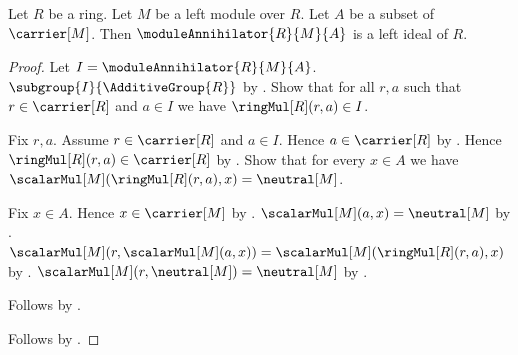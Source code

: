 \begin{theorem}\label{module_annihilator_is_left_ideal}
    Let $R$ be a ring.
    Let $M$ be a left module over $R$.
    Let $A$ be a subset of $\carrier[M]$.
    Then $\moduleAnnihilator{R}{M}{A}$ is a left ideal of $R$.
\end{theorem}
\begin{proof}
    Let $I=\moduleAnnihilator{R}{M}{A}$.
    $\subgroup{I}{\AdditiveGroup{R}}$ by
        .
    Show that for all $r,a$ such that $r\in\carrier[R]$ and $a\in I$
        we have $\ringMul[R](r,a)\in I$.
    \begin{subproof}
        Fix $r,a$.
        Assume $r\in\carrier[R]$ and $a\in I$.
        Hence $a\in\carrier[R]$ by .
        Hence $\ringMul[R](r,a)\in\carrier[R]$ by .
        Show that for every $x\in A$ we have
            $\scalarMul[M](\ringMul[R](r,a),x)=\neutral[M]$.
        \begin{subproof}
            Fix $x\in A$.
            Hence $x\in\carrier[M]$ by .
            $\scalarMul[M](a,x)=\neutral[M]$ by
                .
            $\scalarMul[M](r,\scalarMul[M](a,x))
                =\scalarMul[M](\ringMul[R](r,a),x)$ by
                .
            $\scalarMul[M](r,\neutral[M])=\neutral[M]$ by
                .
        \end{subproof}
        Follows by .
    \end{subproof}
    Follows by .
\end{proof}

